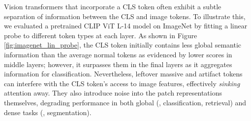 

Vision transformers that incorporate a CLS token often exhibit a subtle separation of information between the CLS and image tokens. To illustrate this, we evaluated a pretrained CLIP ViT L-14 model on ImageNet by fitting a linear probe to different token types at each layer. As shown in Figure \ref{fig:imagenet_lin_probe}, the CLS token initially contains less global semantic information than the average normal tokens as evidenced by lower scores in middle layers; however, it surpasses them in the final layers as it aggregates information for classification. Nevertheless, leftover massive and artifact tokens can interfere with the CLS token’s access to image features, effectively \emph{sinking} attention away. They also introduce noise into the patch representations themselves, degrading performance in both global (\eg, classification, retrieval) and dense tasks (\eg, segmentation).

